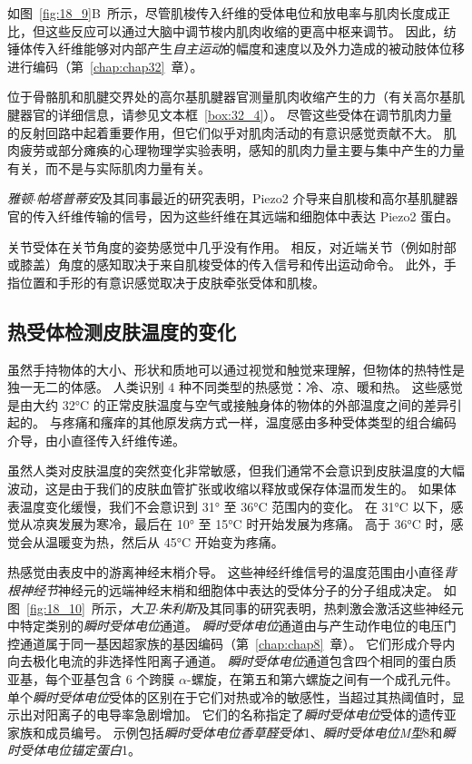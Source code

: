 如图~\ref{fig:18_9}B~所示，尽管肌梭传入纤维的受体电位和放电率与肌肉长度成正比，但这些反应可以通过大脑中调节梭内肌肉收缩的更高中枢来调节。
因此，纺锤体传入纤维能够对内部产生\textit{自主运动}的幅度和速度以及外力造成的被动肢体位移进行编码（第~\ref{chap:chap32}~章）。


位于骨骼肌和肌腱交界处的高尔基肌腱器官测量肌肉收缩产生的力（有关高尔基肌腱器官的详细信息，请参见文本框~\ref{box:32_4}）。
尽管这些受体在调节肌肉力量的反射回路中起着重要作用，但它们似乎对肌肉活动的有意识感觉贡献不大。
肌肉疲劳或部分瘫痪的心理物理学实验表明，感知的肌肉力量主要与集中产生的力量有关，而不是与实际肌肉力量有关。


\textit{雅顿$\cdot$帕塔普蒂安}及其同事最近的研究表明，Piezo2 介导来自肌梭和高尔基肌腱器官的传入纤维传输的信号，因为这些纤维在其远端和细胞体中表达 Piezo2 蛋白。


关节受体在关节角度的姿势感觉中几乎没有作用。
相反，对近端关节（例如肘部或膝盖）角度的感知取决于来自肌梭受体的传入信号和传出运动命令。
此外，手指位置和手形的有意识感觉取决于皮肤牵张受体和肌梭。



\subsection{热受体检测皮肤温度的变化}

虽然手持物体的大小、形状和质地可以通过视觉和触觉来理解，但物体的热特性是独一无二的体感。
人类识别 4 种不同类型的热感觉：冷、凉、暖和热。
这些感觉是由大约 32°C 的正常皮肤温度与空气或接触身体的物体的外部温度之间的差异引起的。
与疼痛和瘙痒的其他原发病方式一样，温度感由多种受体类型的组合编码介导，由小直径传入纤维传递。


虽然人类对皮肤温度的突然变化非常敏感，但我们通常不会意识到皮肤温度的大幅波动，这是由于我们的皮肤血管扩张或收缩以释放或保存体温而发生的。
如果体表温度变化缓慢，我们不会意识到 31° 至 36°C 范围内的变化。
在 31°C 以下，感觉从凉爽发展为寒冷，最后在 10° 至 15°C 时开始发展为疼痛。
高于 36°C 时，感觉会从温暖变为热，然后从 45°C 开始变为疼痛。


热感觉由表皮中的游离神经末梢介导。
这些神经纤维信号的温度范围由小直径\textit{背根神经节}神经元的远端神经末梢和细胞体中表达的受体分子的分子组成决定。
如图~\ref{fig:18_10}~所示，\textit{大卫$\cdot$朱利斯}及其同事的研究表明，热刺激会激活这些神经元中特定类别的\textit{瞬时受体电位}通道。
\textit{瞬时受体电位}通道由与产生动作电位的电压门控通道属于同一基因超家族的基因编码（第~\ref{chap:chap8}~章）。 
它们形成介导内向去极化电流的非选择性阳离子通道。
\textit{瞬时受体电位}通道包含四个相同的蛋白质亚基，每个亚基包含 6 个跨膜 $\alpha$-螺旋，在第五和第六螺旋之间有一个成孔元件。
单个\textit{瞬时受体电位}受体的区别在于它们对热或冷的敏感性，当超过其热阈值时，显示出对阳离子的电导率急剧增加。
它们的名称指定了\textit{瞬时受体电位}受体的遗传亚家族和成员编号。 
示例包括\textit{瞬时受体电位香草醛受体}1、\textit{瞬时受体电位M型}8和\textit{瞬时受体电位锚定蛋白}1。



